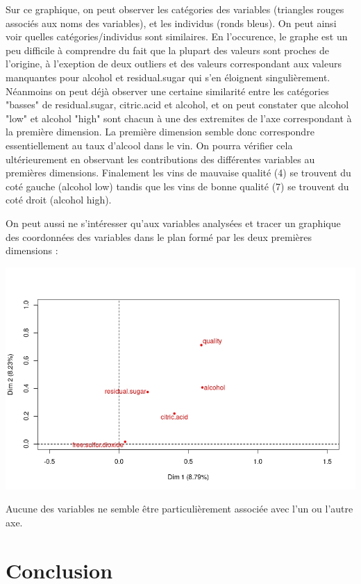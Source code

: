 \documentclass[11pt,a4paper]{article}
\begin{document}
Sur ce graphique, on peut observer les catégories des variables (triangles rouges associés aux noms des variables), et les individus (ronds bleus). On peut ainsi voir quelles catégories/individus sont similaires. En l'occurence, le graphe est un peu difficile à comprendre du fait que la plupart des valeurs sont proches de l'origine, à l'exeption de deux outliers et des valeurs correspondant aux valeurs manquantes pour alcohol et residual.sugar qui s'en éloignent singulièrement. Néanmoins on peut déjà observer une certaine similarité entre les catégories "basses" de residual.sugar, citric.acid et alcohol, et on peut constater que alcohol "low" et alcohol "high" sont chacun à une des extremites de l'axe correspondant à la première dimension. La première dimension semble donc correspondre essentiellement au taux d'alcool dans le vin. On pourra vérifier cela ultérieurement en observant les contributions des différentes variables au premières dimensions. Finalement les vins de mauvaise qualité (4) se trouvent du coté gauche (alcohol low) tandis que les vins de bonne qualité (7) se trouvent du coté droit (alcohol high). \bigskip

On peut aussi ne s'intéresser qu'aux variables analysées et tracer un graphique des coordonnées des variables dans le plan formé par les deux premières dimensions :
\begin{center}
\includegraphics[scale=0.6]{"plot-var-mca"}
\end{center}
 Aucune des variables ne semble être particulièrement associée avec l'un ou l'autre axe.

\section{Conclusion}
\end{document}
